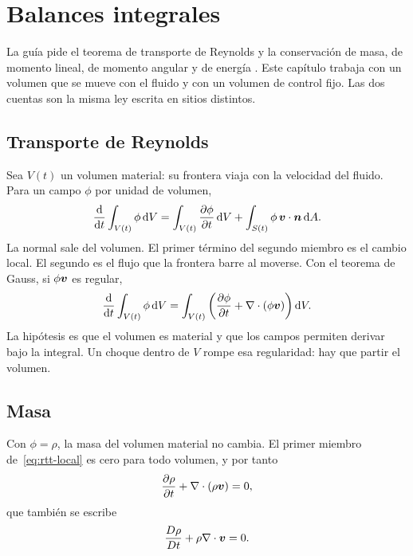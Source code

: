 \chapter{Balances integrales}
\label{ch:conservacion}

La guía pide el teorema de transporte de Reynolds y la conservación de masa, de momento lineal, de momento angular y de energía \parencite{uleGuia2026}. Este capítulo trabaja con un volumen que se mueve con el fluido y con un volumen de control fijo. Las dos cuentas son la misma ley escrita en sitios distintos.

\section{Transporte de Reynolds}

Sea \(V(t)\) un volumen material: su frontera viaja con la velocidad del fluido. Para un campo \(\phi\) por unidad de volumen,
\begin{equation}
\label{eq:rtt}
\frac{\mathrm{d}}{\mathrm{d}t}\int_{V(t)}\phi\,\mathrm{d}V
=\int_{V(t)}\frac{\partial\phi}{\partial t}\,\mathrm{d}V
+\int_{S(t)}\phi\,\boldsymbol{v}\cdot\boldsymbol{n}\,\mathrm{d}A.
\end{equation}
La normal sale del volumen. El primer término del segundo miembro es el cambio local. El segundo es el flujo que la frontera barre al moverse. Con el teorema de Gauss, si \(\phi\boldsymbol{v}\) es regular,
\begin{equation}
\label{eq:rtt-local}
\frac{\mathrm{d}}{\mathrm{d}t}\int_{V(t)}\phi\,\mathrm{d}V
=\int_{V(t)}\left(\frac{\partial\phi}{\partial t}+\nabla\cdot(\phi\boldsymbol{v})\right)\mathrm{d}V.
\end{equation}
 La hipótesis es que el volumen es material y que los campos permiten derivar bajo la integral. Un choque dentro de \(V\) rompe esa regularidad: hay que partir el volumen.

\section{Masa}

Con \(\phi=\rho\), la masa del volumen material no cambia. El primer miembro de~\eqref{eq:rtt-local} es cero para todo volumen, y por tanto
\begin{equation}
\label{eq:continuidad}
\frac{\partial\rho}{\partial t}+\nabla\cdot(\rho\boldsymbol{v})=0,
\end{equation}
que también se escribe
\begin{equation}
\label{eq:continuidad-material}
\frac{D\rho}{Dt}+\rho\nabla\cdot\boldsymbol{v}=0.
\end{equation}

